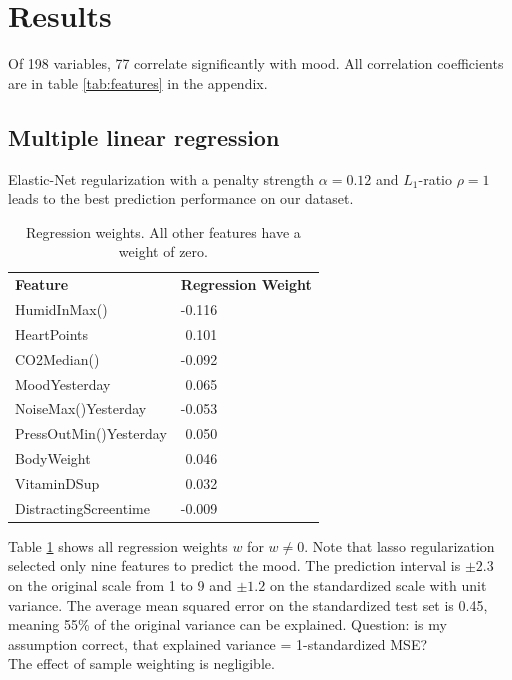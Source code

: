 \documentclass[conference]{IEEEtran}
\begin{document}




\section{Results}
Of 198 variables, 77 correlate significantly with mood. All correlation coefficients are in table \ref{tab:features} in the appendix. 


\subsection{Multiple linear regression}
Elastic-Net regularization with a penalty strength $\alpha=0.12$ and $L_1$-ratio $\rho=1$ leads to the best prediction performance on our dataset.

\begin{table}[]
\caption[]{Regression weights. All other features have a weight of zero.}
\begin{tabular}{ll}
\textbf{Feature}       & \textbf{Regression Weight} \\
HumidInMax()           & -0.116                     \\
HeartPoints            & \,\,0.101                      \\
CO2Median()            & -0.092                     \\
MoodYesterday          & \,\,0.065                      \\
NoiseMax()Yesterday    & -0.053                     \\
PressOutMin()Yesterday & \,\,0.050                      \\
BodyWeight             & \,\,0.046                      \\
VitaminDSup            & \,\,0.032                      \\
DistractingScreentime  & -0.009                    
\end{tabular}
\label{tab:reg}
\end{table}

Table \ref{tab:reg} shows all regression weights $w$ for $w\neq0$. Note that lasso regularization selected only nine features to predict the mood. 
The prediction interval is $\pm2.3$ on the original scale from 1 to 9 and $\pm1.2$ on the standardized scale with unit variance.
The average mean squared error on the standardized test set is 0.45, meaning 55\% of the original variance can be explained.
\color{red}Question: is my assumption correct, that explained variance = 1-standardized MSE?\color{black}\\
The effect of sample weighting is negligible.
\end{document}
